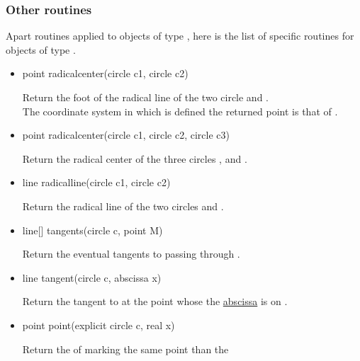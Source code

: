\documentclass[pdftex]{article}
\begin{document}
\subsubsection{Other routines}
Apart routines applied to objects of type , here is the
list of specific routines for objects of type .
\begin{itemize}
\item {}%
  \begin{Vcolor}
    point radicalcenter(circle c1, circle c2)
  \end{Vcolor}
  Return the foot of the radical line of the two circle 
  and .\\
  The coordinate system in which is defined the returned point is
  that of .
\item {}%
  \begin{Vcolor}
    point radicalcenter(circle c1, circle c2, circle c3)
  \end{Vcolor}
  Return the radical center of the three circles , 
  and .
\item {}%
  \begin{Vcolor}
    line radicalline(circle c1, circle c2)
  \end{Vcolor}
  Return the radical line of the two circles 
  and .
\item {}%
  \begin{Vcolor}
    line[] tangents(circle c, point M)
  \end{Vcolor}
  Return the eventual tangents to  passing through .
\item {}
  \begin{Vcolor}
    line tangent(circle c, abscissa x)
  \end{Vcolor}
  Return the tangent to  at the point whose the
  \href{#section.abscissa}{abscissa} is  on .
\item {}
  \begin{Vcolor}
    point point(explicit circle c, real x)
  \end{Vcolor}
  Return the  of  marking the same point than the

\end{itemize}
\end{document}

